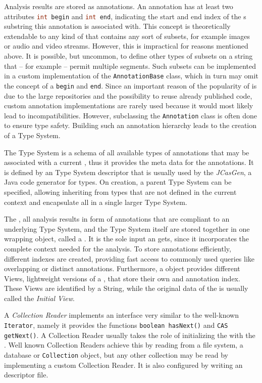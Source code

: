 Analysis results are stored as annotations. An annotation has at least two attributes \lstinline[language=Java]|int begin| and \lstinline[language=Java]|int end|, indicating the start and end index of the \sofa{}s substring this annotation is associated with. This concept is theoretically extendable to any kind of \sofa{} that contains any sort of subsets, for example images or audio and video streams. However, this is impractical for reasons mentioned above. It is possible, but uncommon, to define other types of subsets on a string that -- for example -- permit multiple segments. Such subsets can be implemented in a custom implementation of the \lstinline|AnnotationBase| class, which in turn may omit the concept of a \lstinline|begin| and \lstinline|end|. Since an important reason of the popularity of \uima{} is due to the large \anen{} repositories and the possibility to reuse already published code, custom annotation implementations are rarely used because it would most likely lead to incompatibilities. However, subclassing the \lstinline|Annotation| class is often done to ensure type safety. Building such an annotation hierarchy leads to the creation of a Type System.

The Type System is a schema of all available types of annotations that may be associated with a current \sofa{}, thus it provides the meta data for the annotations. It is defined by an \xml{} Type System descriptor that is usually used by the \emph{JCasGen}, a Java code generator for \uima{} types. On creation, a parent Type System can be specified, allowing inheriting from types that are not defined in the current context and encapsulate all in a single larger Type System.

The \sofa{}, all analysis results in form of annotations that are compliant to an underlying Type System, and the Type System itself are stored together in one wrapping object, called a \cas{}. It is the sole input an \anen{} gets, since it incorporates the complete context needed for the analysis. To store annotations efficiently, different indexes are created, providing fast access to commonly used queries like overlapping or distinct annotations. Furthermore, a \cas{} object provides different Views, lightweight versions of a \cas{}, that store their own \sofa{} and annotation index. These Views are identified by a String, while the original data of the \cas{} is usually called the \emph{Initial View}.

A \emph{Collection Reader} implements an interface very similar to the well-known \lstinline|Iterator|, namely it provides the functions \lstinline|boolean hasNext()| and \lstinline|CAS getNext()|. A Collection Reader usually takes the role of initializing the \cas{} with the \sofa{}. Well known Collection Readers achieve this by reading from a file system, a database or \lstinline|Collection| object, but any other collection may be read by implementing a custom Collection Reader. It is also configured by writing an \xml{} descriptor file.

